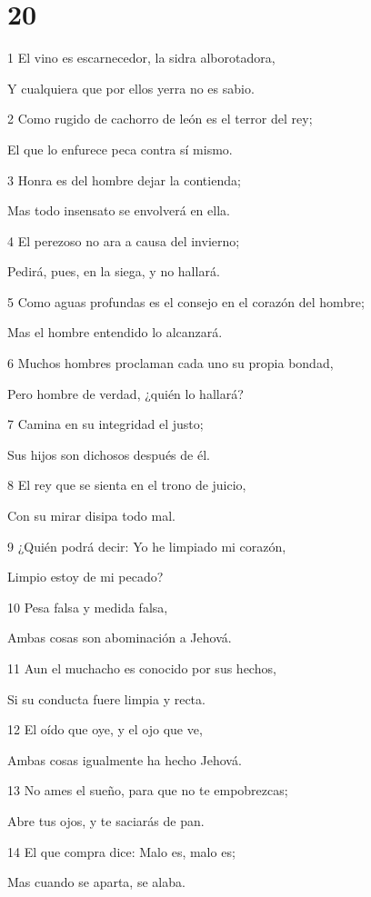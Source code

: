 \chapter{20}

\par 1 El vino es escarnecedor, la sidra alborotadora,
\par Y cualquiera que por ellos yerra no es sabio.
\par 2 Como rugido de cachorro de león es el terror del rey;
\par El que lo enfurece peca contra sí mismo.
\par 3 Honra es del hombre dejar la contienda;
\par Mas todo insensato se envolverá en ella.
\par 4 El perezoso no ara a causa del invierno;
\par Pedirá, pues, en la siega, y no hallará.
\par 5 Como aguas profundas es el consejo en el corazón del hombre;
\par Mas el hombre entendido lo alcanzará.
\par 6 Muchos hombres proclaman cada uno su propia bondad,
\par Pero hombre de verdad, ¿quién lo hallará?
\par 7 Camina en su integridad el justo;
\par Sus hijos son dichosos después de él.
\par 8 El rey que se sienta en el trono de juicio,
\par Con su mirar disipa todo mal.
\par 9 ¿Quién podrá decir: Yo he limpiado mi corazón,
\par Limpio estoy de mi pecado?
\par 10 Pesa falsa y medida falsa,
\par Ambas cosas son abominación a Jehová.
\par 11 Aun el muchacho es conocido por sus hechos,
\par Si su conducta fuere limpia y recta.
\par 12 El oído que oye, y el ojo que ve,
\par Ambas cosas igualmente ha hecho Jehová.
\par 13 No ames el sueño, para que no te empobrezcas;
\par Abre tus ojos, y te saciarás de pan.
\par 14 El que compra dice: Malo es, malo es;
\par Mas cuando se aparta, se alaba.
